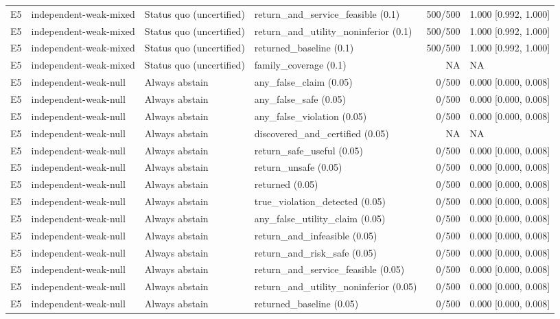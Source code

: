 \begin{longtable}{p{.04\linewidth}p{.18\linewidth}p{.19\linewidth}p{.16\linewidth}r p{.21\linewidth}}
E5 & independent-weak-mixed & Status quo (uncertified) & return\_and\_service\_feasible (0.1) & 500/500 & 1.000 [0.992, 1.000]\\
E5 & independent-weak-mixed & Status quo (uncertified) & return\_and\_utility\_noninferior (0.1) & 500/500 & 1.000 [0.992, 1.000]\\
E5 & independent-weak-mixed & Status quo (uncertified) & returned\_baseline (0.1) & 500/500 & 1.000 [0.992, 1.000]\\
E5 & independent-weak-mixed & Status quo (uncertified) & family\_coverage (0.1) & NA & NA\\
E5 & independent-weak-null & Always abstain & any\_false\_claim (0.05) & 0/500 & 0.000 [0.000, 0.008]\\
E5 & independent-weak-null & Always abstain & any\_false\_safe (0.05) & 0/500 & 0.000 [0.000, 0.008]\\
E5 & independent-weak-null & Always abstain & any\_false\_violation (0.05) & 0/500 & 0.000 [0.000, 0.008]\\
E5 & independent-weak-null & Always abstain & discovered\_and\_certified (0.05) & NA & NA\\
E5 & independent-weak-null & Always abstain & return\_safe\_useful (0.05) & 0/500 & 0.000 [0.000, 0.008]\\
E5 & independent-weak-null & Always abstain & return\_unsafe (0.05) & 0/500 & 0.000 [0.000, 0.008]\\
E5 & independent-weak-null & Always abstain & returned (0.05) & 0/500 & 0.000 [0.000, 0.008]\\
E5 & independent-weak-null & Always abstain & true\_violation\_detected (0.05) & 0/500 & 0.000 [0.000, 0.008]\\
E5 & independent-weak-null & Always abstain & any\_false\_utility\_claim (0.05) & 0/500 & 0.000 [0.000, 0.008]\\
E5 & independent-weak-null & Always abstain & return\_and\_infeasible (0.05) & 0/500 & 0.000 [0.000, 0.008]\\
E5 & independent-weak-null & Always abstain & return\_and\_risk\_safe (0.05) & 0/500 & 0.000 [0.000, 0.008]\\
E5 & independent-weak-null & Always abstain & return\_and\_service\_feasible (0.05) & 0/500 & 0.000 [0.000, 0.008]\\
E5 & independent-weak-null & Always abstain & return\_and\_utility\_noninferior (0.05) & 0/500 & 0.000 [0.000, 0.008]\\
E5 & independent-weak-null & Always abstain & returned\_baseline (0.05) & 0/500 & 0.000 [0.000, 0.008]\\

\end{longtable}
